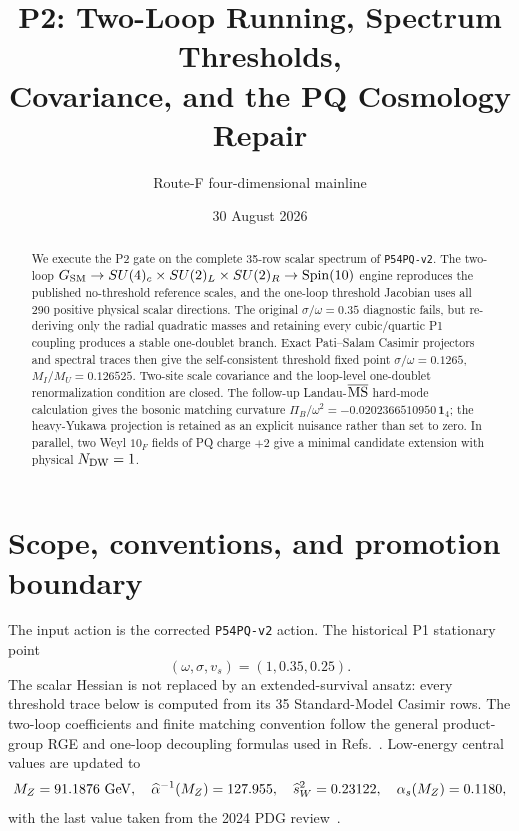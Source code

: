 \documentclass[11pt]{article}
\title{P2: Two-Loop Running, Spectrum Thresholds,\\
Covariance, and the PQ Cosmology Repair}
\author{Route-F four-dimensional mainline}
\date{30 August 2026}
\newcommand{\Spin}{\operatorname{Spin}}
\newcommand{\SM}{G_{\rm SM}}
\begin{document}
\maketitle

\begin{abstract}
We execute the P2 gate on the complete 35-row scalar spectrum of
\texttt{P54PQ-v2}.  The two-loop
$\SM\to SU(4)_c\times SU(2)_L\times SU(2)_R\to\Spin(10)$ engine reproduces
the published no-threshold reference scales, and the one-loop threshold
Jacobian uses all 290 positive physical scalar directions.  The original
$\sigma/\omega=0.35$ diagnostic fails, but re-deriving only the radial
quadratic masses and retaining every cubic/quartic P1 coupling produces a
stable one-doublet branch.  Exact Pati--Salam Casimir projectors and spectral
traces then give the self-consistent threshold fixed point
$\sigma/\omega=0.1265$, $M_I/M_U=0.126525$.  Two-site scale covariance and
the loop-level one-doublet renormalization condition are closed.  The
follow-up Landau-$\overline{\rm MS}$ hard-mode calculation gives the bosonic
matching curvature
$\Pi_B/\omega^2=-0.0202366510950\,\bm1_4$; the heavy-Yukawa projection is
retained as an explicit nuisance rather than set to zero.  In parallel, two
Weyl $10_F$ fields of PQ charge $+2$
give a minimal candidate extension with physical $N_{\rm DW}=1$.
\end{abstract}

\tableofcontents

\section{Scope, conventions, and promotion boundary}

The input action is the corrected \texttt{P54PQ-v2} action.  The historical
P1 stationary point
\begin{equation}
 (\omega,\sigma,v_s)=(1,0.35,0.25).
 \label{eq:p1vevs}
\end{equation}
The scalar Hessian is not replaced by an extended-survival ansatz: every
threshold trace below is computed from its 35 Standard-Model Casimir rows.
The two-loop coefficients and finite matching convention follow the general
product-group RGE and one-loop decoupling formulas used in
Refs.~\cite{MachacekVaughn,BabuKhan2015,Haba2023}.  Low-energy central values
are updated to
\begin{equation}
 M_Z=91.1876\ {\rm GeV},\quad
 \widehat\alpha^{-1}(M_Z)=127.955,\quad
 \widehat s_W^2=0.23122,\quad
 \alpha_s(M_Z)=0.1180,
 \label{eq:inputs}
\end{equation}
with the last value taken from the 2024 PDG review~\cite{PDG2024}.
\end{document}
